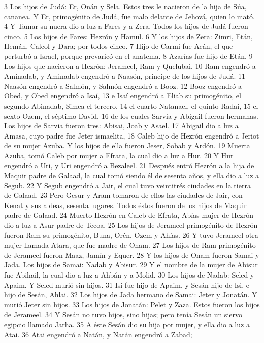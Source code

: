 3 Los hijos de Judá: Er, Onán y Sela. Estos tres le nacieron de la hija de Súa, cananea. Y Er, primogénito de Judá, fue malo delante de Jehová, quien lo mató.
4 Y Tamar su nuera dio a luz a Fares y a Zera. Todos los hijos de Judá fueron cinco.
5 Los hijos de Fares: Hezrón y Hamul.
6 Y los hijos de Zera: Zimri, Etán, Hemán, Calcol y Dara; por todos cinco.
7 Hijo de Carmi fue Acán, el que perturbó a Israel, porque prevaricó en el anatema.
8 Azarías fue hijo de Etán.
9 Los hijos que nacieron a Hezrón: Jerameel, Ram y Quelubai.
10 Ram engendró a Aminadab, y Aminadab engendró a Naasón, príncipe de los hijos de Judá.
11 Naasón engendró a Salmón, y Salmón engendró a Booz.
12 Booz engendró a Obed, y Obed engendró a Isaí,
13 e Isaí engendró a Eliab su primogénito, el segundo Abinadab, Simea el tercero,
14 el cuarto Natanael, el quinto Radai,
15 el sexto Ozem, el séptimo David, 
16 de los cuales Sarvia y Abigail fueron hermanas. Los hijos de Sarvia fueron tres: Abisai, Joab y Asael.
17 Abigail dio a luz a Amasa, cuyo padre fue Jeter ismaelita,
18 Caleb hijo de Hezrón engendró a Jeriot de su mujer Azuba. Y los hijos de ella fueron Jeser, Sobab y Ardón.
19 Muerta Azuba, tomó Caleb por mujer a Efrata, la cual dio a luz a Hur.
20 Y Hur engendró a Uri, y Uri engendró a Bezaleel.
21 Después entró Hezrón a la hija de Maquir padre de Galaad, la cual tomó siendo él de sesenta años, y ella dio a luz a Segub.
22 Y Segub engendró a Jair, el cual tuvo veintitrés ciudades en la tierra de Galaad.
23 Pero Gesur y Aram tomaron de ellos las ciudades de Jair, con Kenat y sus aldeas, sesenta lugares. Todos éstos fueron de los hijos de Maquir padre de Galaad.
24 Muerto Hezrón en Caleb de Efrata, Abías mujer de Hezrón dio a luz a Asur padre de Tecoa.
25 Los hijos de Jerameel primogénito de Hezrón fueron Ram su primogénito, Buna, Orén, Ozem y Ahías.
26 Y tuvo Jerameel otra mujer llamada Atara, que fue madre de Onam.
27 Los hijos de Ram primogénito de Jerameel fueron Maaz, Jamín y Equer.
28 Y los hijos de Onam fueron Samai y Jada. Los hijos de Samai: Nadab y Abisur.
29 Y el nombre de la mujer de Abisur fue Abihail, la cual dio a luz a Ahbán y a Molid.
30 Los hijos de Nadab: Seled y Apaim. Y Seled murió sin hijos.
31 Isi fue hijo de Apaim, y Sesán hijo de Isi, e hijo de Sesán, Ahlai.
32 Los hijos de Jada hermano de Samai: Jeter y Jonatán. Y murió Jeter sin hijos.
33 Los hijos de Jonatán: Pelet y Zaza. Estos fueron los hijos de Jerameel.
34 Y Sesán no tuvo hijos, sino hijas; pero tenía Sesán un siervo egipcio llamado Jarha.
35 A éste Sesán dio su hija por mujer, y ella dio a luz a Atai.
36 Atai engendró a Natán, y Natán engendró a Zabad;
